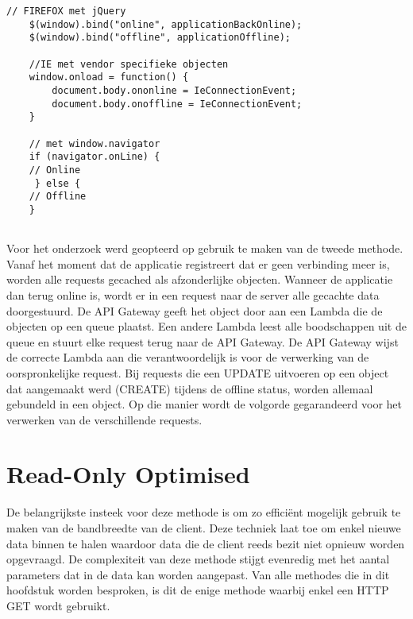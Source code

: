 \begin{lstlisting}[caption=DOM API's voor controleren offline en online status]
    // FIREFOX met jQuery
    $(window).bind("online", applicationBackOnline); 
    $(window).bind("offline", applicationOffline);

    //IE met vendor specifieke objecten
    window.onload = function() {
        document.body.ononline = IeConnectionEvent;
        document.body.onoffline = IeConnectionEvent;
    }
    
    // met window.navigator
    if (navigator.onLine) {
  	// Online
     } else {
  	// Offline
	}
    
\end{lstlisting}

Voor het onderzoek werd geopteerd op gebruik te maken van de tweede methode. Vanaf het moment dat de applicatie registreert dat er geen verbinding meer is, worden alle requests gecached als afzonderlijke objecten. Wanneer de applicatie dan terug online is, wordt er in een request naar de server alle gecachte data doorgestuurd. De API Gateway geeft het object door aan een Lambda die de objecten op een queue plaatst.  Een andere Lambda leest alle boodschappen uit de queue en stuurt elke request terug naar de API Gateway. De API Gateway wijst de correcte Lambda aan die verantwoordelijk is voor de verwerking van de oorspronkelijke request. Bij requests die een UPDATE uitvoeren op een object dat aangemaakt werd (CREATE) tijdens de offline status, worden allemaal gebundeld in een object. Op die manier wordt de volgorde gegarandeerd voor het verwerken van de verschillende requests.

\section{Read-Only Optimised}
De belangrijkste insteek voor deze methode is om zo effici\"ent mogelijk gebruik te maken van de bandbreedte van de client. Deze techniek laat toe om enkel nieuwe data binnen te halen waardoor data die de client reeds bezit niet opnieuw worden opgevraagd. De complexiteit van deze methode stijgt evenredig met het aantal parameters dat in de data kan worden aangepast. Van alle methodes die in dit hoofdstuk worden besproken, is dit de enige methode waarbij enkel een HTTP GET wordt gebruikt.
